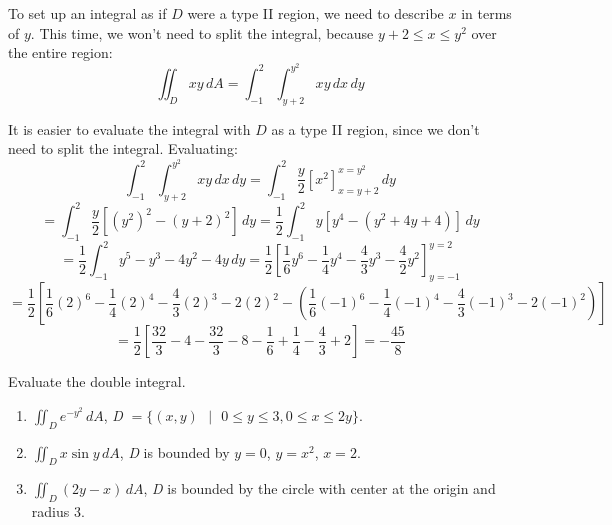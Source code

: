 To set up an integral as if $D$ were a type II region, we need to describe $x$ 
in terms of $y$. This time, we won't need to split the integral, because $y + 2 
\leq x \leq y^2$ over the entire region:
$$\iint_{D} xy\,dA = \int_{-1}^2 \int_{y + 2}^{y^2} xy\,dx\,dy$$

It is easier to evaluate the integral with $D$ as a type II region, since we 
don't need to split the integral. Evaluating:
$$\int_{-1}^2 \int_{y + 2}^{y^2} xy\,dx\,dy = \int_{-1}^2 \frac{y}{2} \left[ 
x^2 \right]_{x = y + 2}^{x = y^2}\,dy$$
$$= \int_{-1}^2 \frac{y}{2} \left[ \left( y^2 \right)^2 - \left( y + 2 
\right)^2 \right]\,dy = \frac{1}{2} \int_{-1}^2 y \left[ y^4 - \left( y^2 + 4y 
+ 4 \right) \right]\,dy$$
$$= \frac{1}{2} \int_{-1}^2 y^5 - y^3 - 4y^2 - 4y\,dy = \frac{1}{2} \left[ 
\frac{1}{6}y^6 - \frac{1}{4}y^4 - \frac{4}{3}y^3 - \frac{4}{2}y^2 \right]_{
y = -1}^{y = 2}$$
$$= \frac{1}{2} \left[ \frac{1}{6} \left( 2 \right)^6 - \frac{1}{4} \left( 2 
\right)^4 - \frac{4}{3} \left( 2 \right)^3 - 2 \left( 2 \right)^2 - \left( 
\frac{1}{6} \left( -1 \right)^6 - \frac{1}{4} \left( -1 \right)^4 - \frac{4}{3} 
\left( -1 \right)^3 - 2 \left( -1 \right)^2 \right) \right]$$
$$= \frac{1}{2} \left[ \frac{32}{3} - 4 - \frac{32}{3} - 8 - \frac{1}{6} + 
\frac{1}{4} - \frac{4}{3} + 2 \right] = -\frac{45}{8}$$

\begin{Exercise}[title = {Double Integrals over Non-Rectangular Regions}, 
label = non-rect]
Evaluate the double integral.
\begin{enumerate}
\item $\iint_{\textit{D}} e^{-y^2} \,dA$, \textit{D} $= \{(x, y) \text{ } | 
\text{ } 0 \leq y \leq 3, 0 \leq x \leq 2y \}$.
\item $\iint_{\textit{D}} x \sin{y}\,dA$, \textit{D} is bounded by $y = 0$, 
$y = x^2$, $x = 2$. 
\item $\iint_{\textit{D}} \left(2y - x \right)\,dA$, \textit{D} is bounded by 
the circle with center at the origin and radius 3. 
\vspace{75mm}
\end{enumerate}
\end{Exercise}

